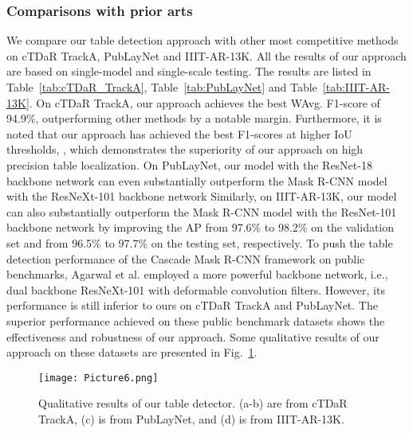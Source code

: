 \documentclass[final,3p,times,twocolumn]{elsarticle}
\begin{document}
\subsubsection{Comparisons with prior arts}
We compare our table detection approach with other most competitive methods on cTDaR TrackA, PubLayNet and IIIT-AR-13K. All the results of our approach are based on single-model and single-scale testing. The results are listed in Table~\ref{tab:cTDaR_TrackA}, Table~\ref{tab:PubLayNet} and Table~\ref{tab:IIIT-AR-13K}. On cTDaR TrackA, our approach achieves the best WAvg. F1-score of 94.9\%, outperforming other methods by a notable margin. Furthermore, it is noted that our approach has achieved the best F1-scores at higher IoU thresholds, {\color{black}{e.g., 92.9\% vs. 91.5\% with the IoU threshold at 0.9}}, which demonstrates the superiority of our approach on high precision table localization. On PubLayNet, our model with the ResNet-18 backbone network can even substantially outperform the Mask R-CNN model with the ResNeXt-101 backbone network {\color{black}{by improving the  from 96.0\% to 97.0\%, and significantly improving the  from 81.4\% to 92.0\%.}} Similarly, on IIIT-AR-13K, our model can also substantially outperform the Mask R-CNN model with the ResNet-101 backbone network by improving the AP from 97.6\% to 98.2\% on the validation set and from 96.5\% to 97.7\% on the testing set, respectively. To push the table detection performance of the Cascade Mask R-CNN framework on public benchmarks, Agarwal et al. \cite{agarwal2021cdec} employed a more powerful backbone network, i.e., dual backbone ResNeXt-101 with deformable convolution filters. However, its performance is still inferior to ours on cTDaR TrackA and PubLayNet. The superior performance achieved on these public benchmark datasets shows the effectiveness and robustness of our approach. Some qualitative results of our approach on these datasets are presented in Fig.~\ref{fig:table_detection_demo}. 

\begin{figure}[t]
    \centering
    \setlength{\abovecaptionskip}{-0.2cm}
    \texttt{[image: Picture6.png]}
    \caption{Qualitative results of our table detector. (a-b) are from cTDaR TrackA, (c) is from PubLayNet, and (d) is from IIIT-AR-13K.}
    \label{fig:table_detection_demo}
\end{figure}
\end{document}
